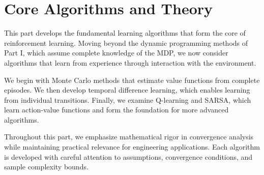 \part{Core Algorithms and Theory}

This part develops the fundamental learning algorithms that form the core of reinforcement learning. Moving beyond the dynamic programming methods of Part I, which assume complete knowledge of the MDP, we now consider algorithms that learn from experience through interaction with the environment.

We begin with Monte Carlo methods that estimate value functions from complete episodes. We then develop temporal difference learning, which enables learning from individual transitions. Finally, we examine Q-learning and SARSA, which learn action-value functions and form the foundation for more advanced algorithms.

Throughout this part, we emphasize mathematical rigor in convergence analysis while maintaining practical relevance for engineering applications. Each algorithm is developed with careful attention to assumptions, convergence conditions, and sample complexity bounds.



